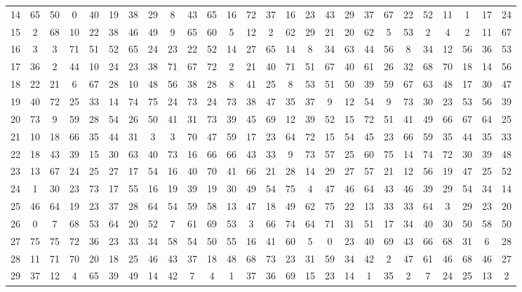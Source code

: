 \begin{table}
\begin{tabular}{c c c c c c c c c c c c c c c c c c c c c c c c c c }
14 & 65 & 50 & 0 & 40 & 19 & 38 & 29 & 8 & 43 & 65 & 16 & 72 & 37 & 16 & 23 & 43 & 29 & 37 & 67 & 22 & 52 & 11 & 1 & 17 & 24 \\
15 & 2 & 68 & 10 & 22 & 38 & 46 & 49 & 9 & 65 & 60 & 5 & 12 & 2 & 62 & 29 & 21 & 20 & 62 & 5 & 53 & 2 & 4 & 2 & 11 & 67 \\
16 & 3 & 3 & 71 & 51 & 52 & 65 & 24 & 23 & 22 & 52 & 14 & 27 & 65 & 14 & 8 & 34 & 63 & 44 & 56 & 8 & 34 & 12 & 56 & 36 & 53 \\
17 & 36 & 2 & 44 & 10 & 24 & 23 & 38 & 71 & 67 & 72 & 2 & 21 & 40 & 71 & 51 & 67 & 40 & 61 & 26 & 32 & 68 & 70 & 18 & 14 & 56 \\
18 & 22 & 21 & 6 & 67 & 28 & 10 & 48 & 56 & 38 & 28 & 8 & 41 & 25 & 8 & 53 & 51 & 50 & 39 & 59 & 67 & 63 & 48 & 17 & 30 & 47 \\
19 & 40 & 72 & 25 & 33 & 14 & 74 & 75 & 24 & 73 & 24 & 73 & 38 & 47 & 35 & 37 & 9 & 12 & 54 & 9 & 73 & 30 & 23 & 53 & 56 & 39 \\
20 & 73 & 9 & 59 & 28 & 54 & 26 & 50 & 41 & 31 & 73 & 39 & 45 & 69 & 12 & 39 & 52 & 15 & 72 & 51 & 41 & 49 & 66 & 67 & 64 & 25 \\
21 & 10 & 18 & 66 & 35 & 44 & 31 & 3 & 3 & 70 & 47 & 59 & 17 & 23 & 64 & 72 & 15 & 54 & 45 & 23 & 66 & 59 & 35 & 44 & 35 & 33 \\
22 & 18 & 43 & 39 & 15 & 30 & 63 & 40 & 73 & 16 & 66 & 66 & 43 & 33 & 9 & 73 & 57 & 25 & 60 & 75 & 14 & 74 & 72 & 30 & 39 & 48 \\
23 & 13 & 67 & 24 & 25 & 27 & 17 & 54 & 16 & 40 & 70 & 41 & 66 & 21 & 28 & 14 & 29 & 27 & 57 & 21 & 12 & 56 & 19 & 47 & 25 & 52 \\
24 & 1 & 30 & 23 & 73 & 17 & 55 & 16 & 19 & 39 & 19 & 30 & 49 & 54 & 75 & 4 & 47 & 46 & 64 & 43 & 46 & 39 & 29 & 54 & 34 & 14 \\
25 & 46 & 64 & 19 & 23 & 37 & 28 & 64 & 54 & 59 & 58 & 13 & 47 & 18 & 49 & 62 & 75 & 22 & 13 & 33 & 33 & 64 & 3 & 29 & 23 & 20 \\
26 & 0 & 7 & 68 & 53 & 64 & 20 & 52 & 7 & 61 & 69 & 53 & 3 & 66 & 74 & 64 & 71 & 31 & 51 & 17 & 34 & 40 & 30 & 50 & 58 & 50 \\
27 & 75 & 75 & 72 & 36 & 23 & 33 & 34 & 58 & 54 & 50 & 55 & 16 & 41 & 60 & 5 & 0 & 23 & 40 & 69 & 43 & 66 & 68 & 31 & 6 & 28 \\
28 & 11 & 71 & 70 & 20 & 18 & 25 & 46 & 43 & 37 & 18 & 48 & 68 & 73 & 23 & 31 & 59 & 34 & 42 & 2 & 47 & 61 & 46 & 68 & 46 & 27 \\
29 & 37 & 12 & 4 & 65 & 39 & 49 & 14 & 42 & 7 & 4 & 1 & 37 & 36 & 69 & 15 & 23 & 14 & 1 & 35 & 2 & 7 & 24 & 25 & 13 & 2 \\

\end{tabular}
\end{table}

